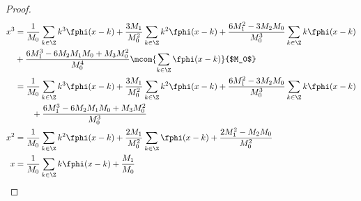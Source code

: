 \begin{proof}
\begin{align*}
  x^3 &=  \frac{1}{M_0}                            \sum_{k\in\Z} k^3 \fphi(x-k)
       +  \frac{3M_1}{M_0^2}                       \sum_{k\in\Z} k^2 \fphi(x-k)
       +  \frac{6M_1^2-3M_2M_0}{M_0^3}             \sum_{k\in\Z} k   \fphi(x-k)
    \\& + \frac{6M_1^3-6M_2M_1M_0+M_3M_0^2}{M_0^4}
          \mcom{\sum_{k\in\Z} \fphi(x-k)}{$M_0$}
    \\&=  \frac{1}{M_0}                            \sum_{k\in\Z} k^3 \fphi(x-k)
       +  \frac{3M_1}{M_0^2}                       \sum_{k\in\Z} k^2 \fphi(x-k)
       +  \frac{6M_1^2-3M_2M_0}{M_0^3}             \sum_{k\in\Z} k   \fphi(x-k)
    \\&\qquad+ \frac{6M_1^3-6M_2M_1M_0+M_3M_0^2}{M_0^3}
\\
  x^2 &=
      \frac{1}{M_0}                \sum_{k\in\Z} k^2 \fphi(x-k)
     +\frac{2M_1}{M_0^2}           \sum_{k\in\Z}     \fphi(x-k)
     +\frac{2M_1^2-M_2M_0}{M_0^2}
\\
  x &=  \frac{1}{M_0}\sum_{k\in\Z} k \fphi(x-k) + \frac{M_1}{M_0}
\end{align*}

\end{proof}


